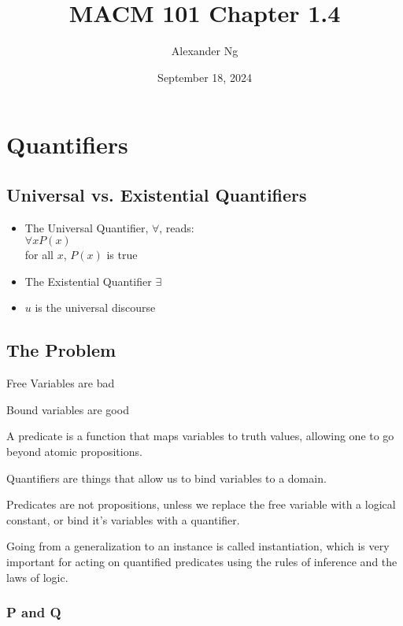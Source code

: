 \documentclass[12pt]{article}
\begin{document}
\title{MACM 101 Chapter 1.4}
\author{Alexander Ng}
\date{September 18, 2024}

\maketitle

\section{Quantifiers}

\subsection{Universal vs. Existential Quantifiers}

\begin{itemize}
  \item The Universal Quantifier, $\forall$, reads:\\
    $\forall x P(x)$ \\
    for all $x$, $P(x)$ is true

  \item The Existential Quantifier $\exists$

  \item $u$ is the universal discourse
\end{itemize}

\subsection{The Problem}

Free Variables are bad

Bound variables are good

A predicate is a function that maps variables to truth values, allowing one to
go beyond atomic propositions.

Quantifiers are things that allow us to bind variables to a domain.

Predicates are not propositions, unless we replace the free variable with
a logical constant, or bind it's variables with a quantifier.

Going from a generalization to an instance is called instantiation, which is 
very important for acting on quantified predicates using the rules of inference
and the laws of logic.

\subsubsection{P and Q}
\end{document}
